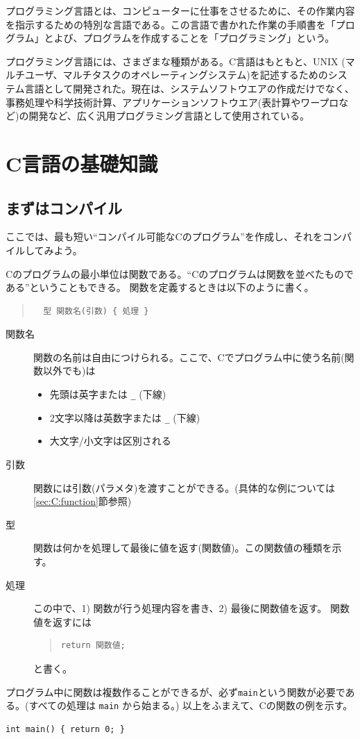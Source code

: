 プログラミング言語とは、コンピューターに仕事をさせるために、その作業内容を指示するための特別な言語である。この言語で書かれた作業の手順書を「プログラム」とよび、プログラムを作成することを「プログラミング」という。

プログラミング言語には、さまざまな種類がある。C言語はもともと、UNIX (マルチユーザ、マルチタスクのオペレーティングシステム)を記述するためのシステム言語として開発された。現在は、システムソフトウエアの作成だけでなく、事務処理や科学技術計算、アプリケーションソフトウエア(表計算やワープロなど)の開発など、広く汎用プログラミング言語として使用されている。

\section{C言語の基礎知識}
\label{sec:C:basic}
\subsection{まずはコンパイル}

ここでは、最も短い``コンパイル可能なCのプログラム''を作成し、それをコンパイルしてみよう。

Cのプログラムの最小単位は関数である。``Cのプログラムは関数を並べたものである''ということもできる。
関数を定義するときは以下のように書く。
\begin{quote}
  \begin{verbatim}
  型 関数名(引数) { 処理 }
  \end{verbatim}
\end{quote}
\begin{description}
\item[関数名] 関数の名前は自由につけられる。ここで、Cでプログラム中に使う名前(関数以外でも)は
  \begin{itemize}
  \item 先頭は英字または \verb+_+ (下線)
  \item 2文字以降は英数字または \verb+_+ (下線)
  \item 大文字/小文字は区別される
  \end{itemize}
\item[引数] 関数には引数(パラメタ)を渡すことができる。(具体的な例については\ref{sec:C:function}節参照)
\item[型] 関数は何かを処理して最後に値を返す(関数値)。この関数値の種類を示す。
\item[処理] この中で、1) 関数が行う処理内容を書き、2) 最後に関数値を返す。
  関数値を返すには
  \begin{quote}
\begin{verbatim}return 関数値;
\end{verbatim}
  \end{quote}
  と書く。
\end{description}
プログラム中に関数は複数作ることができるが、必ず\verb+main+という関数が必要である。(すべての処理は \verb+main+ から始まる。) 以上をふまえて、Cの関数の例を示す。
\begin{reidai}\label{ex:hinagata1}
\begin{verbatim}
int main() { return 0; }
\end{verbatim}
\end{reidai}

